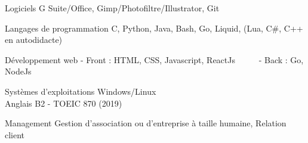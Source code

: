 
\begin{cvskills}

  \cvskill
    {Logiciels} %
    {G Suite/Office, Gimp/Photofiltre/Illustrator, Git} %
    
  \cvskill
    {Langages de programmation} %
    {C, Python, Java, Bash, Go, Liquid, (Lua, C\#, C++ en autodidacte)} %
    
  \cvskill
    {Développement web} %
    {- Front : HTML, CSS, Javascript, ReactJs ~~~~~- Back : Go, NodeJs} %

  \cvskill
    {Systèmes d’exploitations} %
    {Windows/Linux}\\ %
    
  \cvskill
    {Anglais} %
    {B2 - TOEIC 870 (2019)} %
    
  \cvskill
    {Management} %
    {Gestion d'association ou d'entreprise à taille humaine, Relation client} %
    
\end{cvskills}

